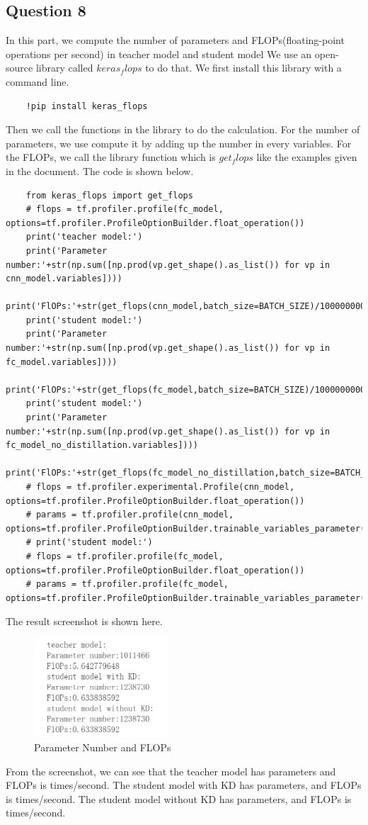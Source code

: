 \documentclass[conference]{IEEEtran}
\begin{document}
\subsection{Question 8}
In this part, we compute the number of parameters and FLOPs(floating-point operations per second) in teacher model and student model
We use an open-source library called $keras_flops$ to do that. We first install this library with a command line.
\begin{lstlisting}
    !pip install keras_flops
\end{lstlisting}
Then we call the functions in the library to do the calculation. For the number of parameters, we use compute it by adding up the number in every variables.
For the FLOPs, we call the library function which is $get_flops$ like the examples given in the document.
The code is shown below.
\begin{lstlisting}
    from keras_flops import get_flops
    # flops = tf.profiler.profile(fc_model, options=tf.profiler.ProfileOptionBuilder.float_operation())
    print('teacher model:')
    print('Parameter number:'+str(np.sum([np.prod(vp.get_shape().as_list()) for vp in cnn_model.variables])))
    print('FlOPs:'+str(get_flops(cnn_model,batch_size=BATCH_SIZE)/1000000000.0))
    print('student model:')
    print('Parameter number:'+str(np.sum([np.prod(vp.get_shape().as_list()) for vp in fc_model.variables])))
    print('FlOPs:'+str(get_flops(fc_model,batch_size=BATCH_SIZE)/1000000000.0))
    print('student model:')
    print('Parameter number:'+str(np.sum([np.prod(vp.get_shape().as_list()) for vp in fc_model_no_distillation.variables])))
    print('FlOPs:'+str(get_flops(fc_model_no_distillation,batch_size=BATCH_SIZE)/1000000000.0))
    # flops = tf.profiler.experimental.Profile(cnn_model, options=tf.profiler.ProfileOptionBuilder.float_operation())
    # params = tf.profiler.profile(cnn_model, options=tf.profiler.ProfileOptionBuilder.trainable_variables_parameter())
    # print('student model:')
    # flops = tf.profiler.profile(fc_model, options=tf.profiler.ProfileOptionBuilder.float_operation())
    # params = tf.profiler.profile(fc_model, options=tf.profiler.ProfileOptionBuilder.trainable_variables_parameter())
\end{lstlisting}
The result screenshot is shown here.

\begin{figure}[h] 
    \centering
    \includegraphics[width=0.45\textwidth]{./graphs/T1Q8.png}
    \caption{Parameter Number and FLOPs}
    \label{Fig.t1q3e}
\end{figure}
From the screenshot, we can see that the teacher model has parameters and FLOPs is times/second. 
The student model with KD has parameters, and FLOPs is times/second. 
The student model without KD has parameters, and FLOPs is times/second. 
\end{document}
